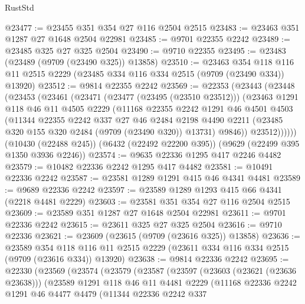 \begin{lexlean}{RustStd}
\begin{coremodule}
@23477 := @23455 @351 @354 @27 @116 @2504 @2515
@23483 := @23463 @351 @1287 @27 @1648 @2504 @22981
@23485 := @9701 @22355 @2242
@23489 := @23485 @325 @27 @325 @2504
@23490 := @9710 @22355
@23495 := @23483 (@23489 (@9709 (@23490 @325)) @13858)
@23510 := @23463
    @354
    @118
    @116
    @11
    @2515
    @2229
    (@23485 @334 @116 @334 @2515 (@9709 (@23490 @334)) @13920)
@23512 := @9814 @22355 @2242
@23569 := @22353
    (@23443
      (@23448
        (@23453
          (@23461
            (@23471
              (@23477 (@23495 (@23510 @23512)))
              (@23463
                @1291
                @118
                @46
                @11
                @4505
                @2229
                (@11168
                  @22355
                  @2242
                  @1291
                  @46
                  @4501
                  @4503
                  (@11344
                    @22355
                    @2242
                    @337
                    @27
                    @46
                    @2484
                    @2198
                    @4490
                    @2211
                    (@23485 @320 @155 @320 @2484 (@9709 (@23490 @320)) @13731)
                    @9846))
                @23512))))))
    (@10430 (@22488 @245))
    (@6432 (@22492 @22200 @395))
    (@9629 (@22499 @395 @1350 @3936 @2246))
@23574 := @9635 @22336 @1295 @417 @2246 @4482
@23579 := @10482 @22336 @2242 @1295 @417 @4482
@23581 := @10491 @22336 @2242
@23587 := @23581 @1289 @1291 @415 @46 @4341 @4481
@23589 := @9689 @22336 @2242
@23597 := @23589 @1289 @1293 @415 @66 @4341 (@2218 @4481 @2229)
@23603 := @23581 @351 @354 @27 @116 @2504 @2515
@23609 := @23589 @351 @1287 @27 @1648 @2504 @22981
@23611 := @9701 @22336 @2242
@23615 := @23611 @325 @27 @325 @2504
@23616 := @9710 @22336
@23621 := @23609 (@23615 (@9709 (@23616 @325)) @13858)
@23636 := @23589
    @354
    @118
    @116
    @11
    @2515
    @2229
    (@23611 @334 @116 @334 @2515 (@9709 (@23616 @334)) @13920)
@23638 := @9814 @22336 @2242
@23695 := @22330
    (@23569
      (@23574
        (@23579
          (@23587
            (@23597
              (@23603 (@23621 (@23636 @23638)))
              (@23589
                @1291
                @118
                @46
                @11
                @4481
                @2229
                (@11168
                  @22336
                  @2242
                  @1291
                  @46
                  @4477
                  @4479
                  (@11344
                    @22336
                    @2242
                    @337

\end{coremodule}
\end{lexlean}
